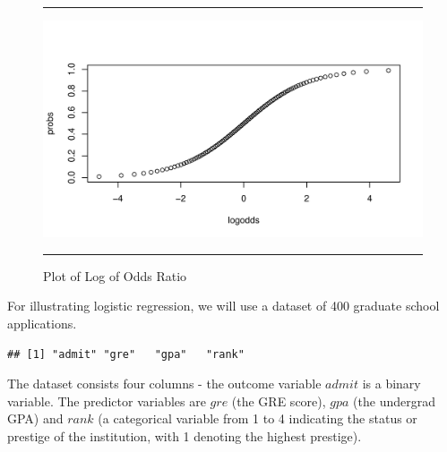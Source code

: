 \documentclass[11pt, letterpaper, twoside]{memoir}\usepackage{knitr}
\begin{document}
\begin{figure}
\centering
\rule{4in}{1pt}
\begin{knitrout}
\color{fgcolor}\begin{kframe}
\begin{alltt}
 \hlkwb{<-} \hlstd{(}\hlstd{,} \hlstd{,} \hlstd{)}
 \hlkwb{=}  \hlopt{/} \hlstd{(} \hlopt{-}  \hlkwb{=} 
\end{alltt}
\end{kframe}
\includegraphics[width=\maxwidth]{figure/unnamed-chunk-75-1} 

\end{knitrout}
\caption{Plot of Log of Odds Ratio}
\label{Fig:logodds}
\rule{4in}{1pt}
\end{figure}

For illustrating logistic regression, we will use a dataset of 400 graduate school applications.
\begin{knitrout}
\color{fgcolor}\begin{kframe}
\begin{alltt}
 \hlkwb{<-} \hlstd{(}\hlstd{)}
\end{alltt}
\begin{verbatim}
## [1] "admit" "gre"   "gpa"   "rank"
\end{verbatim}
\end{kframe}
\end{knitrout}

The dataset consists four columns - the outcome variable $admit$ is a binary variable. The predictor variables are $gre$ (the GRE score), $gpa$ (the undergrad GPA)  and $rank$ (a categorical variable from 1 to 4 indicating the status or prestige of the institution, with 1 denoting the highest prestige). 
\end{document}
